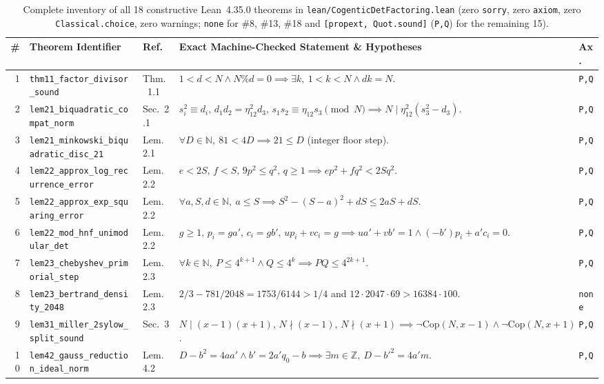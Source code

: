 \documentclass[10pt,twocolumn]{article}
\newcommand{\ZZ}{\mathbb{Z}}
\newcommand{\NN}{\mathbb{N}}
\begin{document}
\begin{table}[t]
\centering
\caption{Complete inventory of all 18 constructive Lean~4.35.0 theorems in \texttt{lean/CogenticDetFactoring.lean} (zero \texttt{sorry}, zero \texttt{axiom}, zero \texttt{Classical.choice}, zero warnings; \texttt{none} for \#8, \#13, \#18 and \texttt{[propext, Quot.sound]} (\texttt{P,Q}) for the remaining 15).}
\label{tab:lean18}
\scriptsize
\setlength{\tabcolsep}{2.5pt}
\begin{tabular}{@{}r l l p{9.6cm} l@{}}
\toprule
\# & Theorem Identifier & Ref.~\cite{cogentic2026detfactoring} & Exact Machine-Checked Statement \& Hypotheses & Ax. \\
\midrule
1 & \texttt{thm11\_factor\_divisor\_sound} & Thm.~1.1 & $1<d<N \wedge N\%d=0 \implies \exists k,\ 1<k<N \wedge d k = N$. & \texttt{P,Q} \\
2 & \texttt{lem21\_biquadratic\_compat\_norm} & Sec.~2.1 & $s_i^2{\equiv}d_i,\,d_1 d_2{=}\eta_{12}^2 d_3,\,s_1 s_2{\equiv}\eta_{12} s_3 \pmod N \implies N\mid\eta_{12}^2(s_3^2-d_3)$. & \texttt{P,Q} \\
3 & \texttt{lem21\_minkowski\_biquadratic\_disc\_21} & Lem.~2.1 & $\forall D\in\NN,\ 81 < 4D \implies 21 \le D$ (integer floor step). & \texttt{P,Q} \\
4 & \texttt{lem22\_approx\_log\_recurrence\_error} & Lem.~2.2 & $e<2S,\,f<S,\,9p^2\le q^2,\,q\ge 1 \implies e p^2 + f q^2 < 2 S q^2$. & \texttt{P,Q} \\
5 & \texttt{lem22\_approx\_exp\_squaring\_error} & Lem.~2.2 & $\forall a,S,d\in\NN,\ a\le S \implies S^2-(S-a)^2 + dS \le 2aS + dS$. & \texttt{P,Q} \\
6 & \texttt{lem22\_mod\_hnf\_unimodular\_det} & Lem.~2.2 & $g\ge 1,\,p_i{=}g a',\,c_i{=}g b',\,u p_i+v c_i{=}g \implies u a'+v b'=1 \wedge (-b')p_i+a'c_i=0$. & \texttt{P,Q} \\
7 & \texttt{lem23\_chebyshev\_primorial\_step} & Lem.~2.3 & $\forall k\in\NN,\ P\le 4^{k+1} \wedge Q\le 4^k \implies P Q \le 4^{2k+1}$. & \texttt{P,Q} \\
8 & \texttt{lem23\_bertrand\_density\_2048} & Lem.~2.3 & $2/3 - 781/2048 = 1753/6144 > 1/4$ and $12\cdot 2047\cdot 69 > 16384\cdot 100$. & \texttt{none} \\
9 & \texttt{lem31\_miller\_2sylow\_split\_sound} & Sec.~3 & $N\mid (x{-}1)(x{+}1),\,N\nmid(x{-}1),\,N\nmid(x{+}1) \implies \neg\text{Cop}(N,x{-}1)\wedge\neg\text{Cop}(N,x{+}1)$. & \texttt{P,Q} \\
10 & \texttt{lem42\_gauss\_reduction\_ideal\_norm} & Lem.~4.2 & $D-b^2=4 a a' \wedge b'=2a'q_0-b \implies \exists m\in\ZZ,\ D-b'^2 = 4 a' m$. & \texttt{P,Q} \\

\end{tabular}
\end{table}
\end{document}
